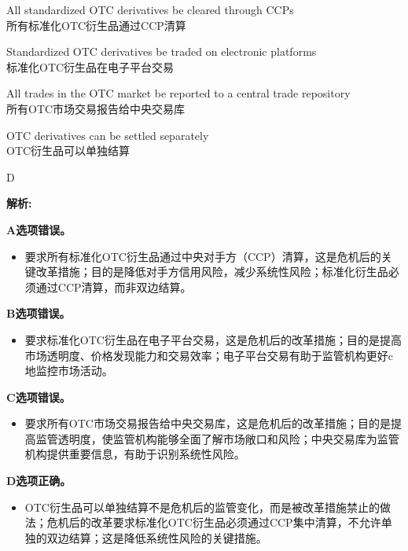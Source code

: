 \documentclass{article}
\newenvironment{explanation}
{\textbf{解析:}\par}
{\par}
\begin{document}
\begin{choices}
    \item All standardized OTC derivatives be cleared through CCPs\\
    所有标准化OTC衍生品通过CCP清算
    \item Standardized OTC derivatives be traded on electronic platforms\\
    标准化OTC衍生品在电子平台交易
    \item All trades in the OTC market be reported to a central trade repository\\
    所有OTC市场交易报告给中央交易库
    \item OTC derivatives can be settled separately\\
    OTC衍生品可以单独结算
\end{choices}

\begin{correctanswer}
    D
\end{correctanswer}

\begin{explanation}
  
    \textbf{A选项错误。}
    \begin{itemize}
        \item 要求所有标准化OTC衍生品通过中央对手方（CCP）清算，这是危机后的关键改革措施；目的是降低对手方信用风险，减少系统性风险；标准化衍生品必须通过CCP清算，而非双边结算。
    \end{itemize}

    \textbf{B选项错误。}
    \begin{itemize}
        \item 要求标准化OTC衍生品在电子平台交易，这是危机后的改革措施；目的是提高市场透明度、价格发现能力和交易效率；电子平台交易有助于监管机构更好c地监控市场活动。
    \end{itemize}

    \textbf{C选项错误。}
    \begin{itemize}
        \item 要求所有OTC市场交易报告给中央交易库，这是危机后的改革措施；目的是提高监管透明度，使监管机构能够全面了解市场敞口和风险；中央交易库为监管机构提供重要信息，有助于识别系统性风险。
    \end{itemize}

    \textbf{D选项正确。}
    \begin{itemize}
        \item OTC衍生品可以单独结算不是危机后的监管变化，而是被改革措施禁止的做法；危机后的改革要求标准化OTC衍生品必须通过CCP集中清算，不允许单独的双边结算；这是降低系统性风险的关键措施。
    \end{itemize}
\end{explanation}
\end{document}
